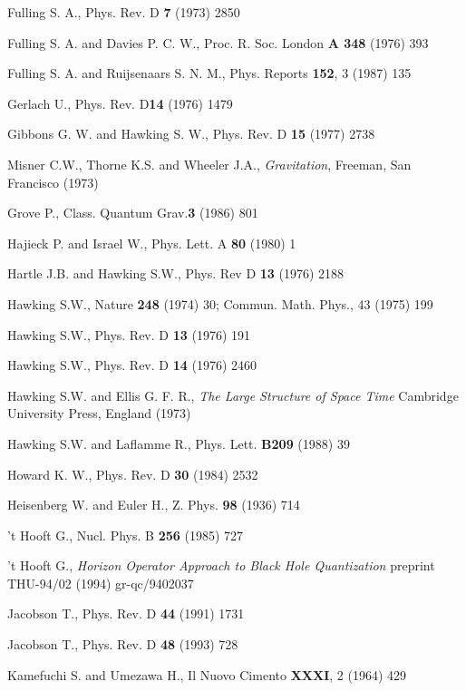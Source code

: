 \documentclass[12pt,oneside]{report}
\begin{document}
\begin{thebibliography}{999}
Fulling S. A., Phys. Rev. D {\bf  7} (1973) 2850 

Fulling S. A. and Davies P. C. W., Proc. R. Soc. 
London {\bf A 348} (1976) 393

Fulling S. A. and Ruijsenaars S. N. M., Phys. Reports {\bf 152}, 3
(1987) 135



Gerlach U., Phys. Rev. D{\bf 14} (1976) 1479

 Gibbons G. W. and Hawking S. W., Phys. Rev. D {\bf
15} (1977) 2738

 Misner C.W., Thorne K.S. and Wheeler J.A., {\em Gravitation}, Freeman, 
San Francisco (1973)

Grove P., Class. Quantum Grav.{\bf  3} (1986) 801

 Hajieck P. and Israel W., Phys. Lett. A {\bf 80} (1980) 1

Hartle J.B. and Hawking S.W., Phys. Rev D {\bf 13} (1976) 2188

Hawking S.W., Nature {\bf  248} (1974) 30;
Commun. Math. Phys., 43 (1975) 199

 Hawking S.W., Phys. Rev. D {\bf 13} (1976) 191

 Hawking S.W., Phys. Rev. D {\bf 14}  (1976)  2460 

 Hawking S.W. and Ellis G. F. R., {\em The Large Structure of Space Time} 
Cambridge University Press, England (1973)

  Hawking S.W. and Laflamme R., Phys. Lett. {\bf B209} (1988) 39

 Howard K. W., Phys. Rev. D {\bf 30} (1984) 2532

Heisenberg W. and Euler H.,  Z. Phys. {\bf  98} (1936) 714

 't Hooft G., Nucl. Phys. B {\bf 256} (1985) 727

 't Hooft G., 
{\em Horizon Operator Approach to Black Hole Quantization} 
preprint THU-94/02 (1994) gr-qc/9402037 


 Jacobson T., Phys. Rev. D {\bf 44} (1991) 1731

 Jacobson T., Phys. Rev. D {\bf 48} (1993) 728

Kamefuchi S. and Umezawa H., Il Nuovo Cimento {\bf  XXXI}, 2 (1964) 429


\end{thebibliography}
\end{document}
